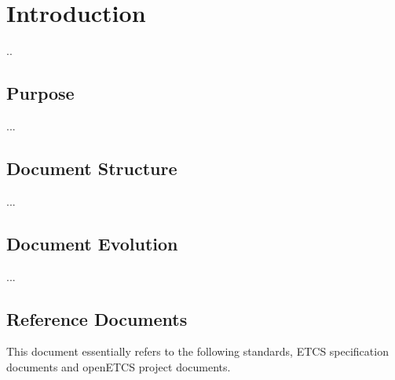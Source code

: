 \documentclass{template/openetcs_report}
\begin{document}

\mainmatter

\chapter{Introduction}
\label{sec:introduction}

..

\section{Purpose}
\label{sec:purpose}

...

\section{Document Structure}
\label{sec:document-structure}

...

\section{Document Evolution}

...

\section{Reference Documents}
\label{sec:refdoc}

This document essentially refers to the following standards, ETCS specification documents and openETCS project documents.
\end{document}

